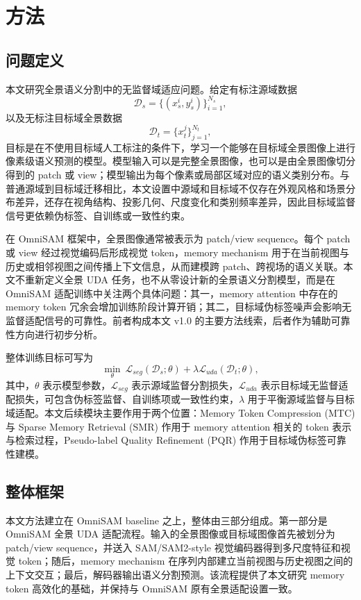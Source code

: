 \section{方法}
\label{sec:method}

\subsection{问题定义}
本文研究全景语义分割中的无监督域适应问题。给定有标注源域数据
\[
\mathcal{D}_s = \{(x_s^i, y_s^i)\}_{i=1}^{N_s},
\]
以及无标注目标域全景数据
\[
\mathcal{D}_t = \{x_t^j\}_{j=1}^{N_t},
\]
目标是在不使用目标域人工标注的条件下，学习一个能够在目标域全景图像上进行像素级语义预测的模型。模型输入可以是完整全景图像，也可以是由全景图像切分得到的 patch 或 view；模型输出为每个像素或局部区域对应的语义类别分布。与普通源域到目标域迁移相比，本文设置中源域和目标域不仅存在外观风格和场景分布差异，还存在视角结构、投影几何、尺度变化和类别频率差异，因此目标域监督信号更依赖伪标签、自训练或一致性约束。

在 OmniSAM 框架中，全景图像通常被表示为 patch/view sequence。每个 patch 或 view 经过视觉编码后形成视觉 token，memory mechanism 用于在当前视图与历史或相邻视图之间传播上下文信息，从而建模跨 patch、跨视场的语义关联。本文不重新定义全景 UDA 任务，也不从零设计新的全景语义分割模型，而是在 OmniSAM 适配训练中关注两个具体问题：其一，memory attention 中存在的 memory token 冗余会增加训练阶段计算开销；其二，目标域伪标签噪声会影响无监督适配信号的可靠性。前者构成本文 v1.0 的主要方法线索，后者作为辅助可靠性方向进行初步分析。

整体训练目标可写为
\[
\min_{\theta}\ \mathcal{L}_{seg}(\mathcal{D}_s;\theta) + \lambda \mathcal{L}_{uda}(\mathcal{D}_t;\theta),
\]
其中，$\theta$ 表示模型参数，$\mathcal{L}_{seg}$ 表示源域监督分割损失，$\mathcal{L}_{uda}$ 表示目标域无监督适配损失，可包含伪标签监督、自训练项或一致性约束，$\lambda$ 用于平衡源域监督与目标域适配。本文后续模块主要作用于两个位置：Memory Token Compression (MTC) 与 Sparse Memory Retrieval (SMR) 作用于 memory attention 相关的 token 表示与检索过程，Pseudo-label Quality Refinement (PQR) 作用于目标域伪标签可靠性建模。

\subsection{整体框架}
本文方法建立在 OmniSAM baseline 之上，整体由三部分组成。第一部分是 OmniSAM 全景 UDA 适配流程。输入的全景图像或目标域图像首先被划分为 patch/view sequence，并送入 SAM/SAM2-style 视觉编码器得到多尺度特征和视觉 token；随后，memory mechanism 在序列内部建立当前视图与历史视图之间的上下文交互；最后，解码器输出语义分割预测。该流程提供了本文研究 memory token 高效化的基础，并保持与 OmniSAM 原有全景适配设置一致。

